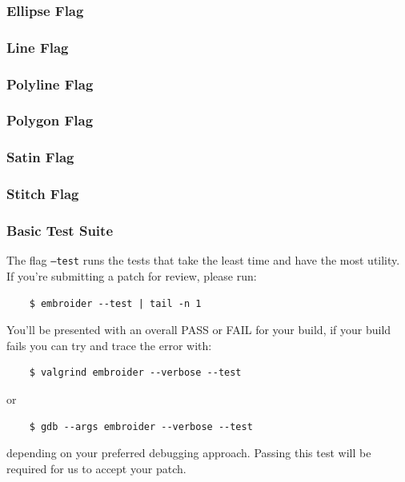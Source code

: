 \documentclass[a4paper, 11pt]{report}
\begin{document}
\subsubsection{Ellipse Flag}

\subsubsection{Line Flag}

\subsubsection{Polyline Flag}

\subsubsection{Polygon Flag}

\subsubsection{Satin Flag}

\subsubsection{Stitch Flag}

\subsubsection{Basic Test Suite}

The flag \texttt{--test} runs the tests that take the least time and have the most utility. If you're submitting a patch for review, please run:

\begin{verbatim}
    $ embroider --test | tail -n 1
\end{verbatim}

You'll be presented with an overall PASS or FAIL for your build,
if your build fails you can try and trace the error with:

\begin{verbatim}
    $ valgrind embroider --verbose --test
  \end{verbatim}

or

\begin{verbatim}
    $ gdb --args embroider --verbose --test
  \end{verbatim}

depending on your preferred debugging approach. Passing this test
will be required for us to accept your patch.
\end{document}
